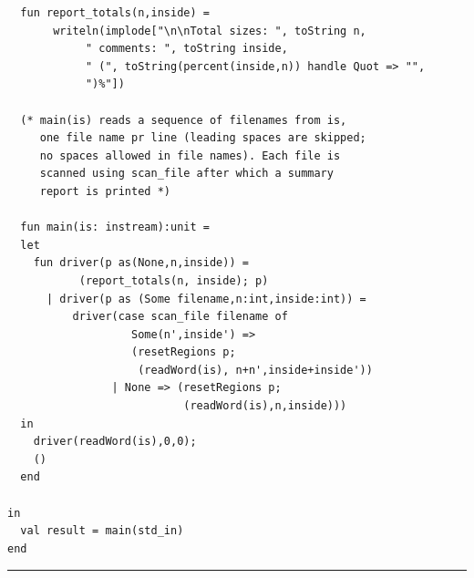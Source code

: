 \documentclass[12pt]{book}
\begin{document}
\begin{verbatim}
  fun report_totals(n,inside) = 
       writeln(implode["\n\nTotal sizes: ", toString n, 
            " comments: ", toString inside,
            " (", toString(percent(inside,n)) handle Quot => "",
            ")%"])

  (* main(is) reads a sequence of filenames from is,
     one file name pr line (leading spaces are skipped;
     no spaces allowed in file names). Each file is 
     scanned using scan_file after which a summary
     report is printed *)

  fun main(is: instream):unit =
  let 
    fun driver(p as(None,n,inside)) = 
           (report_totals(n, inside); p)
      | driver(p as (Some filename,n:int,inside:int)) =
          driver(case scan_file filename of
                   Some(n',inside') =>
                   (resetRegions p; 
                    (readWord(is), n+n',inside+inside'))
                | None => (resetRegions p;
                           (readWord(is),n,inside)))
  in
    driver(readWord(is),0,0);
    ()
  end

in 
  val result = main(std_in)
end
\end{verbatim}
\hrule
\bigskip
\end{document}
